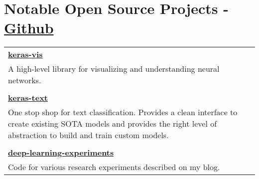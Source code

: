 \documentclass[a4paper,11pt]{article}
\begin{document}
\newpage

\section{Notable Open Source Projects - \href{https://github.com/raghakot}{ Github}}
\begin{longtable}[l]{l}
\textbf{\href{https://github.com/raghakot/keras-vis}{keras-vis}} \\
\footnotesize{ \begin{minipage}[t]{12.5cm} A high-level library for visualizing and understanding neural networks.
\end{minipage}}
\\
 \multicolumn{1}{l}{}
\\
\textbf{\href{https://github.com/raghakot/keras-text}{keras-text}} \\
\footnotesize{ \begin{minipage}[t]{12.5cm} One stop shop for text classification. Provides a clean interface to create existing SOTA models and provides the right level of abstraction to build and train custom models.
\end{minipage}}
\\
 \multicolumn{1}{l}{}
\\
\textbf{\href{https://github.com/raghakot/deep-learning-experiments}{deep-learning-experiments}} \\
\footnotesize{ \begin{minipage}[t]{12.5cm}Code for various research experiments described on my blog.
\end{minipage}}
\end{longtable}
\end{document}

